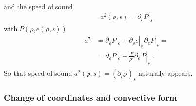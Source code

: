 \documentclass[letterpaper,10pt,english]{jupyterBook}
\begin{document}
\sphinxAtStartPar
and the speed of sound
\begin{equation*}
\begin{split}a^2(\rho,s) = \partial_\rho P|_s\end{split}
\end{equation*}
\sphinxAtStartPar
with \(P(\rho, e(\rho,s))\)
\begin{equation*}
\begin{split}\begin{aligned}
  a^2 
  & = \partial_\rho P|_e + \partial_\rho e|_s \, \partial_e P|_\rho  = \\
  & = \partial_\rho P|_e + \frac{P}{\rho^2}\partial_e \, P|_\rho  \ .
\end{aligned}\end{split}
\end{equation*}
\sphinxAtStartPar
{} So that speed of sound \(a^2(\rho, s) = \left( \partial_\rho p \right)_s\) naturally appears.
\subsubsection*{Change of coordinates and convective form}
\end{document}

